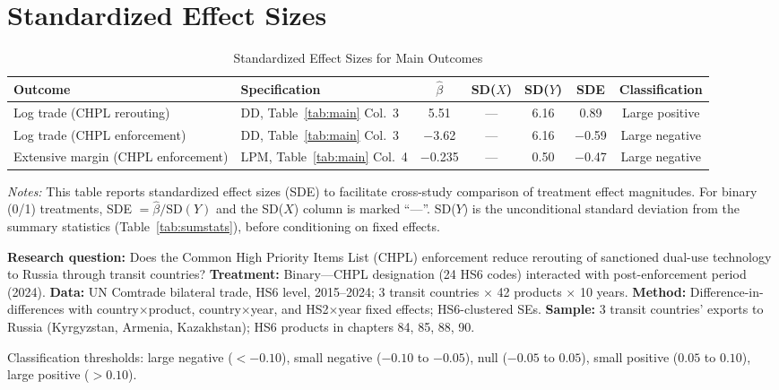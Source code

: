 \documentclass[12pt]{article}
\begin{document}
\section{Standardized Effect Sizes}
\label{sec:sde}

\begin{table}[H]
\centering
\caption{Standardized Effect Sizes for Main Outcomes}
\label{tab:sde}
\begin{adjustbox}{max width=\textwidth}
\begin{tabular}{llccccc}
\toprule
Outcome & Specification & $\hat{\beta}$ & SD($X$) & SD($Y$) & SDE & Classification \\
\midrule
Log trade (CHPL rerouting) & DD, Table~\ref{tab:main} Col.\ 3 & 5.51 & --- & 6.16 & 0.89 & Large positive \\
Log trade (CHPL enforcement) & DD, Table~\ref{tab:main} Col.\ 3 & $-$3.62 & --- & 6.16 & $-$0.59 & Large negative \\
Extensive margin (CHPL enforcement) & LPM, Table~\ref{tab:main} Col.\ 4 & $-$0.235 & --- & 0.50 & $-$0.47 & Large negative \\
\bottomrule
\end{tabular}
\end{adjustbox}
\par\vspace{0.3em}
{\footnotesize \emph{Notes:} This table reports standardized effect sizes (SDE)
to facilitate cross-study comparison of treatment effect magnitudes.
For binary (0/1) treatments, SDE $= \hat{\beta} / \text{SD}(Y)$ and the SD($X$)
column is marked ``---''.
SD($Y$) is the unconditional standard deviation from the summary
statistics (Table~\ref{tab:sumstats}), before conditioning on fixed effects.

\textbf{Research question:} Does the Common High Priority Items List (CHPL) enforcement reduce rerouting of sanctioned dual-use technology to Russia through transit countries?
\textbf{Treatment:} Binary---CHPL designation (24 HS6 codes) interacted with post-enforcement period (2024).
\textbf{Data:} UN Comtrade bilateral trade, HS6 level, 2015--2024; 3 transit countries $\times$ 42 products $\times$ 10 years.
\textbf{Method:} Difference-in-differences with country$\times$product, country$\times$year, and HS2$\times$year fixed effects; HS6-clustered SEs.
\textbf{Sample:} 3 transit countries' exports to Russia (Kyrgyzstan, Armenia, Kazakhstan); HS6 products in chapters 84, 85, 88, 90.

Classification thresholds:
large negative ($< -0.10$), small negative ($-0.10$ to $-0.05$),
null ($-0.05$ to $0.05$), small positive ($0.05$ to $0.10$),
large positive ($> 0.10$).}
\end{table}
\end{document}
